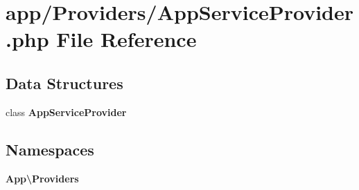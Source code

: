 \section{app/\+Providers/\+App\+Service\+Provider.php File Reference}
\label{_app_service_provider_8php}
\subsection*{Data Structures}
\begin{DoxyCompactItemize}
\item 
class {\bf App\+Service\+Provider}
\end{DoxyCompactItemize}
\subsection*{Namespaces}
\begin{DoxyCompactItemize}
\item 
 {\bf App\textbackslash{}\+Providers}
\end{DoxyCompactItemize}
